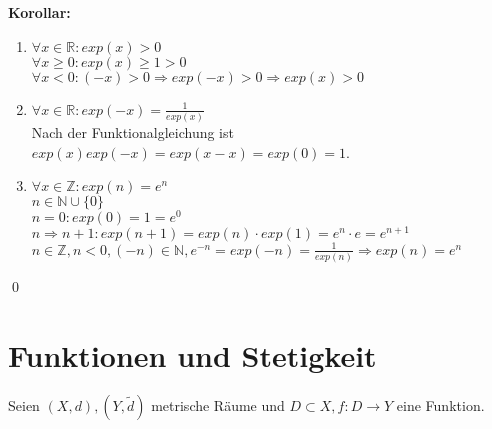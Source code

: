 \documentclass[ngerman,titlepage,twoside, parskip=half*]{scrreprt}
\newcommand*{\N}{\mathbb{N}}
\newcommand*{\Z}{\mathbb{Z}}
\newcommand*{\R}{\mathbb{R}}
\theoremstyle{plain}
\theoremstyle{definition}
\theoremstyle{remark}
\begin{document}
\textbf{Korollar:}
\begin{enumerate}[(1)]
  \item $\forall x \in \R \colon exp(x)>0$\\
    $\forall x\geq 0\colon exp(x)\geq 1>0$\\
    $\forall x<0\colon(-x)>0\Rightarrow exp(-x)>0\Rightarrow exp(x)>0$
  \item $\forall x\in \R \colon exp(-x)=\frac{1}{exp(x)}$\\
    Nach der Funktionalgleichung ist $exp(x)exp(-x)=exp(x-x)=exp(0)=1$.
  \item $\forall x \in \Z \colon exp(n)=e^n$\\
    $n\in \N \cup \{0\}$\\
    $n=0\colon exp(0)=1=e^0$\\
    $n\Rightarrow n+1\colon exp(n+1)=exp(n)\cdot exp(1)=e^n\cdot e=e^{n+1}$\\
    $n\in \Z , n<0, (-n)\in \N, e^{-n}=exp(-n)=\frac{1}{exp(n)}\Rightarrow exp(n)=e^n$
\end{enumerate}
\qed

\chapter{Funktionen und Stetigkeit}
Seien $(X,d), (Y,\tilde{d})$ metrische Räume und $D\subset X, f\colon D\rightarrow Y$ eine Funktion.
\end{document}
